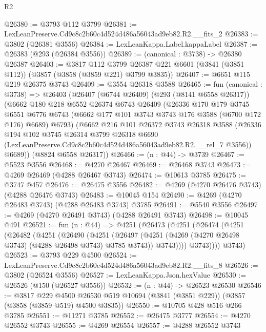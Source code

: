 \begin{lexlean}{R2}
\begin{coremodule}
@26380 := @3793 @112 @3799
@26381 := LexLeanPreserve.Cd9c8c2b60c4d524d486a56043ad9eb82.R2.__fits_2
@26383 := @3802 (@26381 @3556)
@26384 := LexLeanKappa.Label.kappaLabel
@26387 := @26383 (@293 (@26384 @3556))
@26389 := (canonical : @3738) -> @26380 @26387
@26403 := @3817
    @112
    @3799
    @26387
    @221
    @6601
    (@3841 (@3851 @112))
    (@3857 (@3858 (@3859 @221) @3799 @3835))
@26407 := @6651 @115 @219 @26375 @3743
@26409 := @3554 @26318 @3588
@26465 := fun (canonical : @3738) =>
  @26403
    (@26407
      (@6744 @26409)
      (@293 (@8141 @6558 @26317))
      (@6662
        @180
        @218
        @6552
        @26374
        @6743
        @26409
        (@26336
          @170
          @179
          @3745
          @6551
          @6776
          @6743
          (@6662 @177 @101 @3743 @3743 @176 @3588 (@6700 @172 @176) @6689)
          @6793)
        (@6662
          @216
          @101
          @26372
          @3743
          @26318
          @3588
          (@26336
            @194
            @102
            @3745
            @26314
            @3799
            @26318
            @6690
            (LexLeanPreserve.Cd9c8c2b60c4d524d486a56043ad9eb82.R2.__rel_7 @3556))
          @6689))
      (@8824 @6558 @26317))
@26466 := (n : @44) -> @3739
@26467 := @5523 @3556
@26468 := @4270 @26467
@26469 := @26468 @3743
@26473 := @4269 @26469 (@4288 @26467 @3743)
@26474 := @10613 @3785
@26475 := @3747 @457
@26476 := @26475 @3556
@26482 := @4269 (@4270 @26476 @3743) (@4288 @26476 @3743)
@26483 := @10045 @154
@26490 := @4269 (@4270 @26483 @3743) (@4288 @26483 @3743) @3785
@26491 := @5540 @3556
@26497 := @4269 (@4270 @26491 @3743) (@4288 @26491 @3743)
@26498 := @10045 @491
@26521 := fun (n : @44) =>
  @4251
    (@26473
      (@4251
        (@26474
          (@4251
            (@26482
              (@4251
                (@26490
                  (@4251
                    (@26497
                      (@4251 (@4269 (@4270 @26498 @3743) (@4288 @26498 @3743) @3785 @3743))
                      @3743))))
              @3743))))
      @3743)
@26523 := @3793 @229 @4500
@26524 := LexLeanPreserve.Cd9c8c2b60c4d524d486a56043ad9eb82.R2.__fits_8
@26526 := @3802 (@26524 @3556)
@26527 := LexLeanKappa.Json.hexValue
@26530 := @26526 (@150 (@26527 @3556))
@26532 := (n : @44) -> @26523 @26530
@26546 := @3817
    @229
    @4500
    @26530
    @519
    @10694
    (@3841 (@3851 @229))
    (@3857 (@3858 (@3859 @519) @4500 @3835))
@26550 := @10705 @428 @516 @266 @3785
@26551 := @11271 @3785
@26552 := @26475 @3777
@26554 := @4270 @26552 @3743
@26555 := @4269 @26554
@26557 := @4288 @26552 @3743

\end{coremodule}
\end{lexlean}
